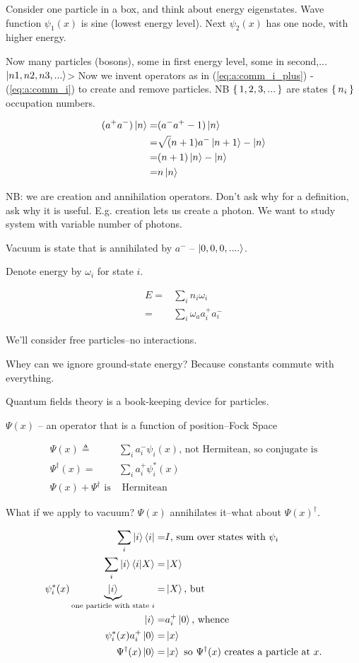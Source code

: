 \documentclass[]{article}
\begin{document}
Consider one particle in a box, and think about energy eigenstates. Wave function $\psi_1(x)$ is sine (lowest energy level). Next $\psi_2(x)$ has one node, with higher energy.

Now many particles (bosons), some in first energy level, some in second,...$\ket{n1,n2,n3,...}$> Now we invent operators as in (\ref{eq:a:comm_i_plus}) - (\ref{eq:a:comm_i}) to create and remove particles. NB $\set{1,2,3,...}$ are states $\set{n_i}$ occupation numbers.

\begin{align*}
(a^+a^-)\ket{n}=&(a^-a^+-1)\ket{n}\\
=&\sqrt(n+1)a^-\ket{n+1}-\ket{n}\\
=&(n+1)\ket{n}-\ket{n}\\
=&n\ket{n}
\end{align*}

NB: we are  creation and annihilation operators. Don't ask why for a definition, ask why it is useful. E.g. creation lets us create a photon. We want to study system with variable number of photons.

Vacuum is state that is annihilated by $a^-$ -- $\ket{0,0,0,....}$.

Denote energy by $\omega_i$ for state $i$. 

\begin{align*}
E =& \sum_{i} n_i \omega_i\\
=& \sum_{i} \omega_a a^+_i a^-_i 
\end{align*}

We'll consider free particles--no interactions.

Whey can we ignore ground-state energy? Because constants commute with everything. 

Quantum fields theory is a book-keeping device for particles.

$\Psi(x)$ -- an operator that is a function of position--Fock Space

\begin{align*}
\Psi(x)\triangleq&\sum_{i}a^-_i\psi_i(x)\text{, not Hermitean, so conjugate is}\\
\Psi^\dagger(x)=&\sum_{i}a^+_i\psi_i^*(x)\\
\Psi(x)+\Psi^\dagger \text{ is}&\text{ Hermitean}
\end{align*}

What if we apply to vacuum? $\Psi(x)$ annihilates it--what about $\Psi(x)^\dagger$.

\begin{align*}
\sum_{i} \ket{i} \bra{i} =& I \text{, sum over states with $\psi_i$}\\
\sum_{i} \ket{i} \braket{i|X} =& \ket{X}\\
\psi^*_i(x)\underbrace{\ket{i}}_\text{one particle with state $i$} =& \ket{X}\text{, but}\\
\ket{i} =& a^+_i\ket{0} \text{, whence}\\
\psi^*_i(x) a^+_i\ket{0}=&\ket{x}\\
\Psi^\dagger(x) \ket{0} =& \ket{x}\text{ so $\Psi^\dagger(x)$ creates a particle at $x$.}
\end{align*}
\end{document}

